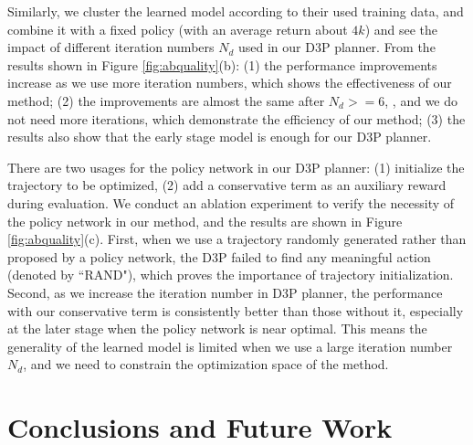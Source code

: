 \documentclass{article} %
\begin{document}
 Similarly, we cluster the learned model according to their used training data, and combine it with a fixed policy (with an average return about $4k$) and see the impact of different iteration numbers $N_d$ used in our D3P planner. From the results shown in Figure \ref{fig:abquality}(b): (1) the performance improvements increase as we use more iteration numbers, which shows the effectiveness of our method; (2) the improvements are almost the same after  $N_d>=6$, ,  and we do not need more iterations, which demonstrate the efficiency of our method; (3) the results also show that the early stage model is enough for our D3P planner.


 There are two usages for the policy network in our D3P planner: (1) initialize the trajectory to be optimized, (2) add a conservative term as an auxiliary reward during evaluation. We conduct an ablation experiment to verify the necessity of the policy network in our method, and the results are shown in Figure \ref{fig:abquality}(c). First, when we use a trajectory randomly generated rather than proposed by a policy network, the D3P failed to find any meaningful action (denoted by ``RAND"), which proves the importance of trajectory initialization. Second, as we increase  the iteration number in D3P planner, the performance with our conservative term is consistently better than those without it, especially at the later stage when the policy network is near optimal. This means the generality of the learned model is limited when we use a large iteration number $N_d$, and we need to constrain the optimization space of the method.








\section{Conclusions and Future Work}
\end{document}
